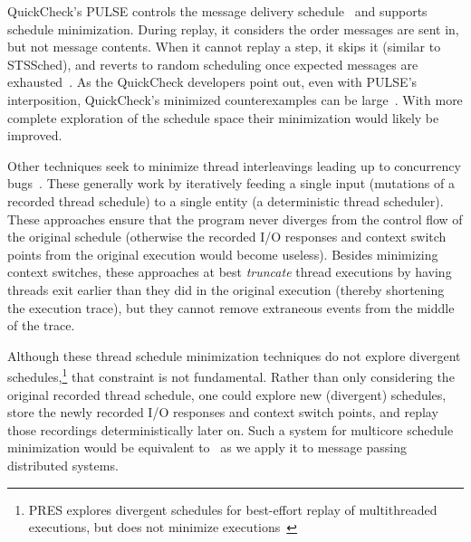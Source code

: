 
QuickCheck's PULSE controls the message delivery
schedule~\cite{claessen2009finding} and supports schedule minimization. During replay, it considers the
order messages are sent in, but not message contents.
When it cannot replay a step, it skips it (similar to
STSSched), and reverts to random scheduling once expected messages
are exhausted~\cite{hughes_email}. As the QuickCheck developers point
out, even with PULSE's interposition, QuickCheck's minimized counterexamples can be
large~\cite{pulse_counterexamples}. With more complete exploration of the
schedule space their minimization would likely be improved.

 Other techniques seek to minimize thread
interleavings leading up to concurrency
bugs~\cite{choi2002isolating,jalbert2010trace,huang2011efficient,el2014efficient}.
These generally work by iteratively feeding a single input (mutations of a
recorded thread schedule) to a single entity (a deterministic thread scheduler). These approaches
ensure that the program never diverges from the control flow of the
original schedule (otherwise the recorded I/O responses and context switch points
from the original execution would become useless). Besides minimizing context
switches, these approaches at
best {\em truncate} thread executions by having threads exit earlier than they did in the original
execution (thereby shortening the execution trace), but they cannot remove extraneous events from
the middle of the trace.

Although these thread schedule minimization techniques do not
explore divergent schedules,\footnote{PRES
explores divergent schedules for best-effort replay of multithreaded
executions, but does not minimize executions~\cite{park2009pres}}
 that constraint is not fundamental. Rather than
only considering the original recorded thread schedule, one
could explore new (divergent) schedules, store the newly recorded
I/O responses and context switch points, and replay those recordings
deterministically later on. Such a system
for multicore schedule minimization would be equivalent to \sys~as we apply it to message passing
distributed systems.

